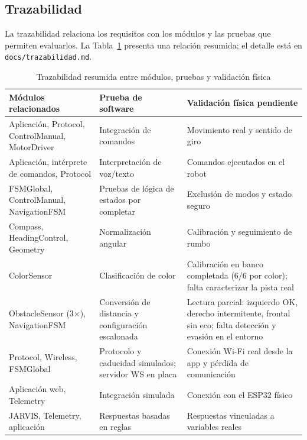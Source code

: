 \documentclass[journal]{IEEEtran}
\begin{document}
\subsection{Trazabilidad}

La trazabilidad relaciona los requisitos con los módulos y las pruebas que permiten evaluarlos. La Tabla~\ref{tab:trazabilidad} presenta una relación resumida; el detalle está en \texttt{docs/trazabilidad.md}.

\begin{table}[t]
\centering
\caption{Trazabilidad resumida entre módulos, pruebas y validación física}
\label{tab:trazabilidad}
\scriptsize
\begin{tabular}{p{} p{} p{}}
\toprule
\textbf{Módulos relacionados} & \textbf{Prueba de software} & \textbf{Validación física pendiente} \\
\midrule
Aplicación, Protocol, ControlManual, MotorDriver & Integración de comandos & Movimiento real y sentido de giro \\
Aplicación, intérprete de comandos, Protocol & Interpretación de voz/texto & Comandos ejecutados en el robot \\
FSMGlobal, ControlManual, NavigationFSM & Pruebas de lógica de estados por completar & Exclusión de modos y estado seguro \\
Compass, HeadingControl, Geometry & Normalización angular & Calibración y seguimiento de rumbo \\
ColorSensor & Clasificación de color & Calibración en banco completada (6/6 por color); falta caracterizar la pista real \\
ObstacleSensor (3×), NavigationFSM & Conversión de distancia y configuración escalonada & Lectura parcial: izquierdo OK, derecho intermitente, frontal sin eco; falta detección y evasión en el entorno \\
Protocol, Wireless, FSMGlobal & Protocolo y caducidad simulados; servidor WS en placa & Conexión Wi-Fi real desde la app y pérdida de comunicación \\
Aplicación web, Telemetry & Integración simulada & Conexión con el ESP32 físico \\
JARVIS, Telemetry, aplicación & Respuestas basadas en reglas & Respuestas vinculadas a variables reales \\
\bottomrule
\end{tabular}
\end{table}

\end{document}
